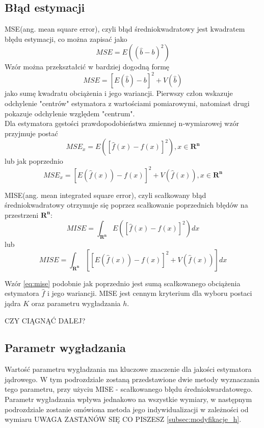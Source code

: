 \subsection{Błąd estymacji}
MSE(ang. mean square error), czyli błąd średniokwadratowy jest kwadratem błędu estymacji, co można zapisać jako
\begin{equation}
MSE = E({(\hat{b}-b)}^2 )
\end{equation}
Wzór można przekształcić w bardziej dogodną formę
\begin{equation}
MSE = {[E(\hat{b})-b]}^2 +V(\hat{b})
\end{equation}
jako sumę kwadratu obciążenia i jego wariancji. Pierwszy człon wskazuje odchylenie "centrów" estymatora z wartościami pomiarowymi, natomiast drugi pokazuje odchylenie względem "centrum". \\
Dla estymatora gęstości prawdopodobieństwa zmiennej n-wymiarowej wzór przyjmuje postać
\begin{equation}
MSE_x = E({[\hat{f}(x)-f(x)]}^2), x \in \mathbf{R^n}
\end{equation}
lub jak poprzednio
\begin{equation}
MSE_x = {[E(\hat{f}(x))-f(x)]}^2 + V(\hat{f}(x)), x \in \mathbf{R^n}
\end{equation}

MISE(ang. mean integrated square error), czyli scałkowany błąd średniokwadratowy otrzymuje się poprzez scałkowanie poprzednich błędów na przestrzeni $\mathbf{R^n}$:
\begin{equation}
MISE = \int_{\mathbf{R^n}} E({[\hat{f}(x)-f(x)]}^2) dx
\end{equation}
lub
\begin{equation}
\label{eq:mise}
MISE = \int_{\mathbf{R^n}} [{[E(\hat{f}(x))-f(x)]}^2 + V(\hat{f}(x))]dx
\end{equation}

Wzór \eqref{eq:mise} podobnie jak poprzednio jest sumą scałkowanego obciążenia estymatora $\hat{f}$ i jego wariancji. MISE jest cennym kryterium dla wyboru postaci jądra $K$ oraz parametru wygładzania $h$.

CZY CIĄGNĄĆ DALEJ? 

\subsection{Parametr wygładzania}

Wartość parametru wygładzania ma kluczowe znaczenie dla jakości estymatora jądrowego. W tym podrozdziale zostaną przedstawione dwie metody wyznaczania tego parametru, przy użyciu MISE - scałkowanego błędu średniokwardatowego. Parametr wygładzania wpływa jednakowo na wszystkie wymiary, w następnym podrozdziale zostanie omówiona metoda jego indywidualizacji w zależności od wymiaru UWAGA ZASTANÓW SIĘ CO PISZESZ \ref{subsec:modyfikacje_h}.

